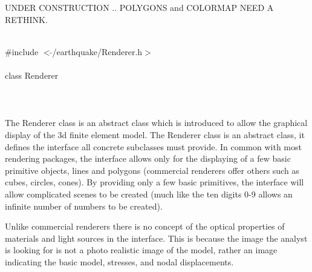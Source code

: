 
UNDER CONSTRUCTION .. POLYGONS and COLORMAP NEED A RETHINK.

   \\
\indent \#include $<\tilde{ }$/earthquake/Renderer.h$>$  \\

  \\
\indent class Renderer   \\

 \\
 \\

 \\ 
\indent 
The Renderer class is an abstract class which is introduced to allow
the graphical display of the 3d finite element model. The Renderer class
is an abstract class, it defines the interface all concrete subclasses
must provide. In common with most rendering packages, the interface
allows only for the displaying of a few basic primitive objects, lines
and polygons (commercial renderers offer others such as cubes,
circles, cones). By providing only a few basic primitives, the
interface will allow complicated scenes to be created (much like the
ten digits 0-9 allows an infinite number of numbers to be created).

Unlike commercial renderers there is no concept of the optical
properties of materials and light sources in the interface. This is
because the image the analyst is looking for is not a photo realistic
image of the model, rather an image indicating the basic model,
stresses, and nodal displacements.   \\

